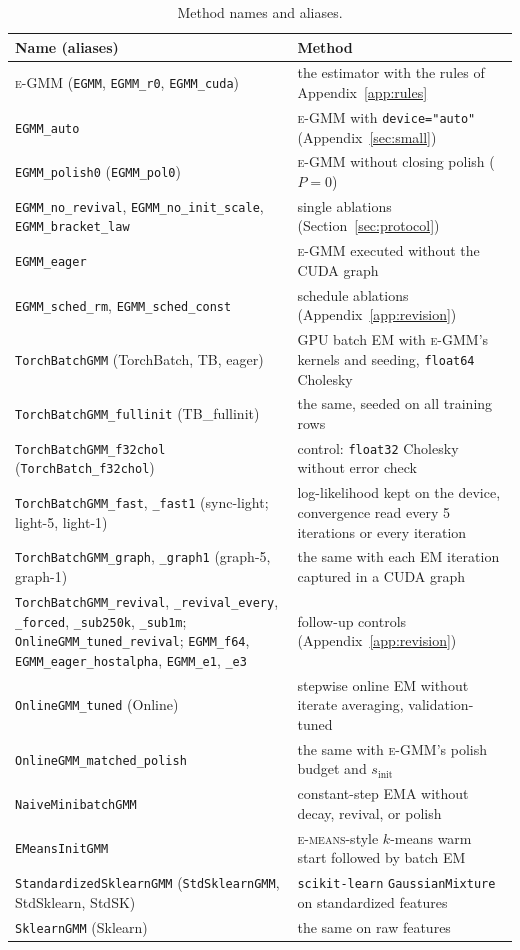 \documentclass[10pt]{article} %
\newcommand{\egmm}{\textsc{e-GMM}}
\newcommand{\emeans}{\textsc{e-means}}
\begin{document}
\begin{table}[htbp]
\centering
\caption{Method names and aliases.}
\label{tab:glossary}
\small
\begin{tabular}{p{6.2cm}p{8.4cm}}
\toprule
\textbf{Name (aliases)} & \textbf{Method} \\
\midrule
\egmm{} (\texttt{EGMM}, \texttt{EGMM\_r0}, \texttt{EGMM\_cuda}) & the estimator with the rules of Appendix~\ref{app:rules} \\
\texttt{EGMM\_auto} & \egmm{} with \texttt{device="auto"} (Appendix~\ref{sec:small}) \\
\texttt{EGMM\_polish0} (\texttt{EGMM\_pol0}) & \egmm{} without closing polish ($P = 0$) \\
\texttt{EGMM\_no\_revival}, \texttt{EGMM\_no\_init\_scale}, \texttt{EGMM\_bracket\_law} & single ablations (Section~\ref{sec:protocol}) \\
\texttt{EGMM\_eager} & \egmm{} executed without the CUDA graph \\
\texttt{EGMM\_sched\_rm}, \texttt{EGMM\_sched\_const} & schedule ablations (Appendix~\ref{app:revision}) \\
\texttt{TorchBatchGMM} (TorchBatch, TB, eager) & GPU batch EM with \egmm{}'s kernels and seeding, \texttt{float64} Cholesky \\
\texttt{TorchBatchGMM\_fullinit} (TB\_fullinit) & the same, seeded on all training rows \\
\texttt{TorchBatchGMM\_f32chol} (\texttt{TorchBatch\_f32chol}) & control: \texttt{float32} Cholesky without error check \\
\texttt{TorchBatchGMM\_fast}, \texttt{\_fast1} (sync-light; light-5, light-1) & log-likelihood kept on the device, convergence read every 5 iterations or every iteration \\
\texttt{TorchBatchGMM\_graph}, \texttt{\_graph1} (graph-5, graph-1) & the same with each EM iteration captured in a CUDA graph \\
\texttt{TorchBatchGMM\_revival}, \texttt{\_revival\_every}, \texttt{\_forced}, \texttt{\_sub250k}, \texttt{\_sub1m}; \texttt{OnlineGMM\_tuned\_revival}; \texttt{EGMM\_f64}, \texttt{EGMM\_eager\_hostalpha}, \texttt{EGMM\_e1}, \texttt{\_e3} & follow-up controls (Appendix~\ref{app:revision}) \\
\texttt{OnlineGMM\_tuned} (Online) & stepwise online EM without iterate averaging, validation-tuned \\
\texttt{OnlineGMM\_matched\_polish} & the same with \egmm{}'s polish budget and $s_{\mathrm{init}}$ \\
\texttt{NaiveMinibatchGMM} & constant-step EMA without decay, revival, or polish \\
\texttt{EMeansInitGMM} & \emeans{}-style $k$-means warm start followed by batch EM \\
\texttt{StandardizedSklearnGMM} (\texttt{StdSklearnGMM}, StdSklearn, StdSK) & \texttt{scikit-learn} \texttt{GaussianMixture} on standardized features \\
\texttt{SklearnGMM} (Sklearn) & the same on raw features \\
\bottomrule
\end{tabular}
\end{table}
\end{document}
